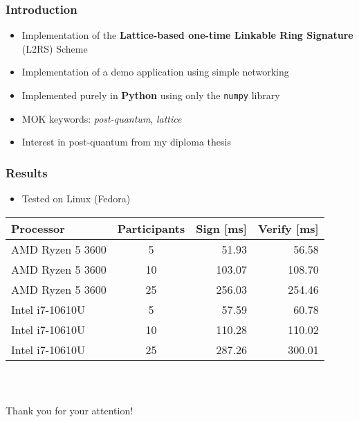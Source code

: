 \documentclass[%
  14pt,       				%
	t,                  %
	aspectratio=1610,   %
	unicode,						%
]{beamer}				    	%
\begin{document}
\disablenavigationsymbols

\maketitle


\begin{frame}[c]
	\frametitle{Introduction}
	\large{
		\begin{itemize}
			\item Implementation of the \textbf{Lattice-based one-time Linkable Ring Signature} (L2RS) Scheme
			\item Implementation of a demo application using simple networking
			\item Implemented purely in \textbf{Python} using only the \texttt{numpy} library
			\item MOK keywords: \textit{post-quantum}, \textit{lattice}
			\item Interest in post-quantum from my diploma thesis
		\end{itemize}
	}
\end{frame}

\begin{frame}[c]
	\frametitle{Results}
	\large{
		\begin{itemize}
			\item Tested on Linux (Fedora)
		\end{itemize}
	}
	\begin{table}[htbp]
		\centering
		\begin{tabular}{|l|c|r|r|}
			\hline
			Processor        & Participants & Sign [ms] & Verify [ms] \\
			\hline
			AMD Ryzen 5 3600 & 5            & 51.93     & 56.58       \\
			AMD Ryzen 5 3600 & 10           & 103.07    & 108.70      \\
			AMD Ryzen 5 3600 & 25           & 256.03    & 254.46      \\
			Intel i7-10610U  & 5            & 57.59     & 60.78       \\
			Intel i7-10610U  & 10           & 110.28    & 110.02      \\
			Intel i7-10610U  & 25           & 287.26    & 300.01      \\
			\hline
		\end{tabular}
	\end{table}
\end{frame}

\begin{frame}[c]
	\frametitle{\mbox{ }}
	\begin{center}
		{\Huge Thank you for your attention!}
	\end{center}
\end{frame}
\end{document}
